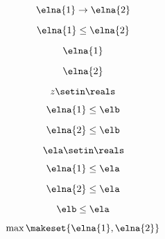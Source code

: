 {\begin{forslides}
    \begin{equation}
        \label{eq:combination-132}
        \elna{1}\to \elna{2}
    \end{equation}

    \begin{equation}
        \label{eq:combination-133}
        \elna{1}\leq \elna{2}
    \end{equation}

    \begin{equation}
        \label{eq:combination-134}
        \elna{1}
    \end{equation}

    \begin{equation}
        \label{eq:combination-135}
        \elna{2}
    \end{equation}

    \begin{equation}
        \label{eq:combination-136}
        z\setin \reals
    \end{equation}

    \begin{equation}
        \label{eq:combination-137}
        \elna{1}\leq \elb
    \end{equation}

    \begin{equation}
        \label{eq:combination-138}
        \elna{2}\leq \elb
    \end{equation}

    \begin{equation}
        \label{eq:combination-139}
        \ela\setin \reals
    \end{equation}

    \begin{equation}
        \label{eq:combination-140}
        \elna{1}\leq \ela
    \end{equation}

    \begin{equation}
        \label{eq:combination-141}
        \elna{2}\leq \ela
    \end{equation}

    \begin{equation}
        \label{eq:combination-142}
        \elb\leq \ela
    \end{equation}

    \begin{equation}
        \label{eq:combination-143}
        \max\makeset{\elna{1},\elna{2}}
    \end{equation}


\end{forslides}}
